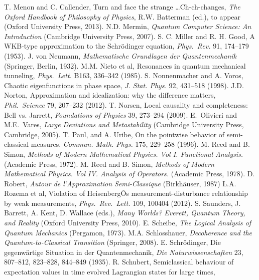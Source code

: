 \documentclass[12pt]{article}
\begin{document}
\begin{thebibliography}{99}
\begin{footnotesize}
   T. Menon and C. Callender, Turn and face the strange \ldots Ch-ch-changes, 
 \emph{The Oxford Handbook of Philosophy of Physics}, 
R.W. Batterman (ed.), to appear (Oxford University Press, 2013). 
 N.D. Mermin, \emph{Quantum Computer Science: An Introduction}
(Cambridge University Press, 2007). 
 S. C. Miller  and R. H.  Good, A {WKB}-type approximation to the {S}chr{\"o}dinger equation, \emph{Phys.\ Rev.}
91, 174--179 (1953). 
 J. von Neumann, {\it Mathematische Grundlagen der Quantenmechanik} (Springer, Berlin, 1932).
 M.M. Nieto et al, Resonances in quantum mechanical tunneling, \emph{Phys.\ Lett.} B163, 336--342 (1985). 
  S. Nonnenmacher and A. Voros,  Chaotic eigenfunctions in phase space, \emph{J. Stat. Phys.} 92, 431--518 (1998).
 J.D. Norton,  Approximation and idealization: why the difference matters, \emph{Phil.\ Science} 79, 207--232 (2012).
 T. Norsen, Local causality and completeness: Bell vs. Jarrett, \emph{ Foundations of Physics} 39, 273--294 (2009). 
E.\ Olivieri and M.E.\ Vares, \emph{Large Deviations and Metastability} (Cambridge University
Press, Cambridge, 2005).
  T. Paul, and A. Uribe, On the pointwise behavior of semi-classical measures.  {\it Commun. Math. Phys.}  175, 229--258  (1996).
   M. Reed and B. Simon, {\it Methods of Modern Mathematical Physics. Vol I. Functional Analysis.} (Academic Press, 1972).
   M. Reed and B. Simon, {\it Methods of Modern Mathematical Physics. Vol IV. Analysis of Operators.} (Academic Press, 1978).
  D. Robert,  {\it Autour de l'Approximation
 Semi-Classique} (Birkh\"{a}user, 1987) 
  L.A. Rozema et al, Violation of HeisenbergÕs measurement-disturbance relationship by weak measurements,
 \emph{Phys.\ Rev.\ Lett.} 109, 100404 (2012). 
  S. Saunders, J. Barrett, A. Kent, D. Wallace (eds.), \emph{Many Worlds? Everett, Quantum Theory, and Reality} (Oxford University Press, 2010).
  E. Scheibe,  {\it The Logical Analysis of Quantum Mechanics} (Pergamon, 1973).
 M.A. Schlosshauer, \emph{Decoherence and the Quantum-to-Classical Transition} (Springer, 2008). 
 E. Schr\"{o}dinger, Die gegenw\"{a}rtige Situation in der Quantenmechanik, \emph{Die Naturwissenschaften} 23, 807--812, 823--828, 844--849  (1935).
 R. Schubert, Semiclassical behaviour of expectation values in time evolved Lagrangian states for large times,

\end{footnotesize}
\end{thebibliography}
\end{document}

